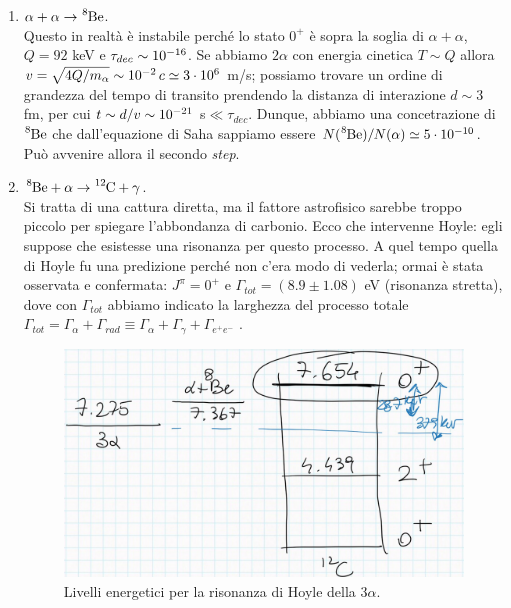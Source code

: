 \begin{enumerate}[1)]
	\item $\alpha +\alpha \to \ce{^8Be}$.\\ 
	Questo in realtà è instabile perché lo stato $0^+$ è sopra la soglia di $\alpha+\alpha$, $Q=92$ keV e $\tau_{dec}\sim 10^{-16}$. Se abbiamo $2\alpha$ con energia cinetica $T\sim Q$ allora $v= \sqrt{4Q/m_\alpha}\sim 10^{-2}\, c \simeq 3\cdot10^{6}$ m/s; possiamo trovare un ordine di grandezza del tempo di transito prendendo la distanza di interazione $d\sim 3$ fm, per cui $t\sim d/v \sim 10^{-21}$ s$\ll \tau_{dec}$. Dunque, abbiamo una  concetrazione di $\ce{^8Be}$ che dall'equazione di Saha sappiamo essere $N(\ce{^8Be})/N(\alpha)\simeq 5\cdot\ord{-10}$. Può avvenire allora il secondo \textit{step}.
	\item $\ce{^8Be + \alpha \to \ce{^{12}C} +\gamma}$.\\ 
	Si tratta di una cattura diretta, ma il fattore astrofisico sarebbe troppo piccolo per spiegare l'abbondanza di carbonio. Ecco che intervenne Hoyle: egli suppose che esistesse una risonanza per questo processo. A quel tempo quella di Hoyle fu una predizione perché non c'era modo di vederla; ormai è stata osservata e confermata: $J^{\pi}=0^+$ e $\Gamma_{tot} = (8.9\pm 1.08)$ eV (risonanza stretta), dove con $\Gamma_{tot}$ abbiamo indicato la larghezza del processo totale $\Gamma_{tot} = \Gamma_\alpha + \Gamma_{rad}\equiv \Gamma_\alpha + \Gamma_\gamma + \Gamma_{e^+e^-}$ .
	\begin{figure}[!h]
		\centering
		\includegraphics[scale=0.4]{Immagini/0421_riso.png}
		\caption{Livelli energetici per la risonanza di Hoyle della $3\alpha$.}
		\label{0421_hoyle}
	\end{figure}
\end{enumerate}

